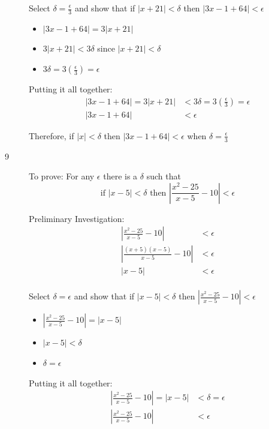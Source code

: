 \documentclass{exam}
\begin{document}
\begin{description}
  Select $\delta = \frac{\epsilon}{3}$ and show that if $|x + 21| < \delta$ then $|3x - 1 + 64| < \epsilon$

  \begin{itemize}
    \item $|3x - 1 + 64| = 3|x + 21|$
    \item $3|x + 21| < 3 \delta$ since $|x + 21| < \delta$
    \item $3 \delta = 3 \left( \frac{\epsilon}{3} \right) = \epsilon$
  \end{itemize}

  Putting it all together:
  \begin{align*}
    |3x - 1 + 64| = 3|x + 21| &< 3 \delta = 3 \left( \frac{\epsilon}{3} \right) = \epsilon \\
    |3x - 1 + 64| &< \epsilon
  \end{align*}

  Therefore, if $|x| < \delta$ then $|3x - 1 + 64| < \epsilon$ when $\delta = \frac{\epsilon}{3}$

  \item[9]
  To prove: For any $\epsilon$ there is a $\delta$ such that 
  \[
    \text{if } |x - 5| < \delta \text{ then } \left|\frac{x^2 - 25}{x-5} - 10\right| < \epsilon
  \]

  Preliminary Investigation:
  \begin{align*}
    \left| \frac{x^2 - 25}{x-5} - 10 \right| &< \epsilon \\
    \left| \frac{(x+5)(x-5)}{x-5} - 10 \right| &< \epsilon \\
    |x - 5| &< \epsilon \\
  \end{align*}

  Select $\delta = \epsilon$ and show that if $|x - 5| < \delta$ then $\left| \frac{x^2 - 25}{x-5} - 10 \right| < \epsilon$

  \begin{itemize}
    \item $\left| \frac{x^2 - 25}{x-5} - 10 \right| = \left| x - 5 \right|$
    \item $\left| x - 5 \right| < \delta$
    \item $\delta = \epsilon$
  \end{itemize}

  Putting it all together:
  \begin{align*}
    \left| \frac{x^2 - 25}{x-5} - 10 \right| = | x - 5 | &< \delta = \epsilon \\ 
    \left| \frac{x^2 - 25}{x-5} - 10 \right| &< \epsilon \\ 
  \end{align*}


\end{description}
\end{document}
